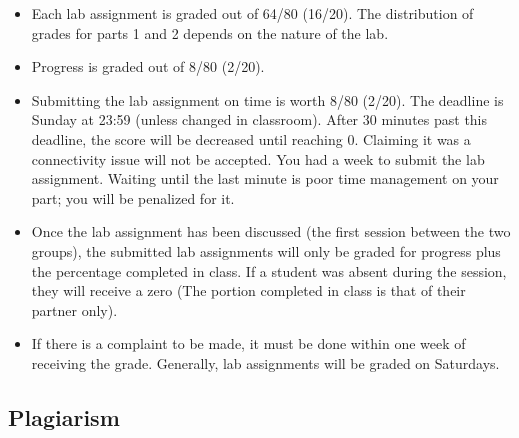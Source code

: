 \documentclass[11pt, a4paper]{article}
\begin{document}
\begin{itemize}
	\item Each lab assignment is graded out of 64/80 (16/20). 
	The distribution of grades for parts 1 and 2 depends on the nature of the lab.
	\item Progress is graded out of 8/80 (2/20).
	\item Submitting the lab assignment on time is worth 8/80 (2/20). 
	The deadline is Sunday at 23:59 (unless changed in classroom).
	After 30 minutes past this deadline, the score will be decreased until reaching 0.
	Claiming it was a connectivity issue will not be accepted.
	You had a week to submit the lab assignment.
	Waiting until the last minute is poor time management on your part; you will be penalized for it.
	\item Once the lab assignment has been discussed (the first session between the two groups), the submitted lab assignments will only be graded for progress plus the percentage completed in class.
	If a student was absent during the session, they will receive a zero (The portion completed in class is that of their partner only).
	\item If there is a complaint to be made, it must be done within one week of receiving the grade. 
	Generally, lab assignments will be graded on Saturdays.
	
\end{itemize}

\subsection{Plagiarism}
\end{document}
